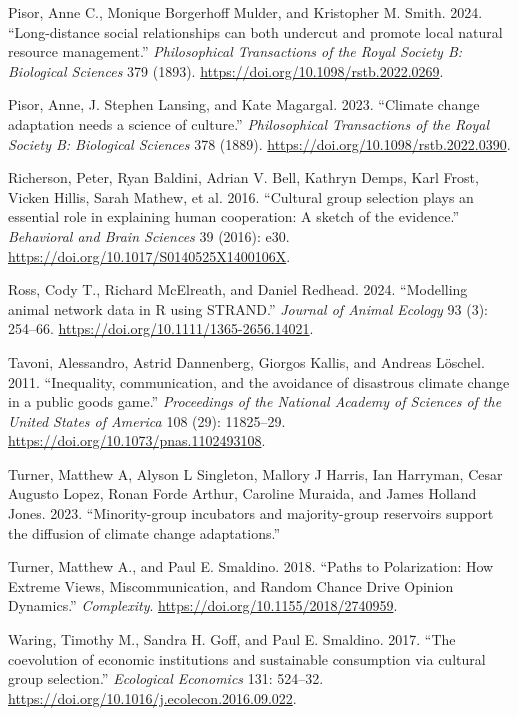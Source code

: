 \documentclass[letterpaper]{article}
\newlength{\cslhangindent}
\newenvironment{CSLReferences}[2] %
 {\begin{list}{}{%
  \setlength{\itemindent}{0pt}
  \setlength{\leftmargin}{0pt}
  \setlength{\parsep}{0pt}
  \ifodd #1
   \setlength{\leftmargin}{\cslhangindent}
   \setlength{\itemindent}{-1\cslhangindent}
  \fi
  \setlength{\itemsep}{#2\baselineskip}}}
 {\end{list}}
\begin{document}
\begin{CSLReferences}{1}{0}
Pisor, Anne C., Monique Borgerhoff Mulder, and Kristopher M. Smith.
2024. {``{Long-distance social relationships can both undercut and
promote local natural resource management}.''} \emph{Philosophical
Transactions of the Royal Society B: Biological Sciences} 379 (1893).
\url{https://doi.org/10.1098/rstb.2022.0269}.

Pisor, Anne, J. Stephen Lansing, and Kate Magargal. 2023. {``{Climate
change adaptation needs a science of culture}.''} \emph{Philosophical
Transactions of the Royal Society B: Biological Sciences} 378 (1889).
\url{https://doi.org/10.1098/rstb.2022.0390}.

Richerson, Peter, Ryan Baldini, Adrian V. Bell, Kathryn Demps, Karl
Frost, Vicken Hillis, Sarah Mathew, et al. 2016. {``{Cultural group
selection plays an essential role in explaining human cooperation: A
sketch of the evidence}.''} \emph{Behavioral and Brain Sciences} 39
(2016): e30. \url{https://doi.org/10.1017/S0140525X1400106X}.

Ross, Cody T., Richard McElreath, and Daniel Redhead. 2024.
{``{Modelling animal network data in R using STRAND}.''} \emph{Journal
of Animal Ecology} 93 (3): 254--66.
\url{https://doi.org/10.1111/1365-2656.14021}.

Tavoni, Alessandro, Astrid Dannenberg, Giorgos Kallis, and Andreas
Löschel. 2011. {``{Inequality, communication, and the avoidance of
disastrous climate change in a public goods game}.''} \emph{Proceedings
of the National Academy of Sciences of the United States of America} 108
(29): 11825--29. \url{https://doi.org/10.1073/pnas.1102493108}.

Turner, Matthew A, Alyson L Singleton, Mallory J Harris, Ian Harryman,
Cesar Augusto Lopez, Ronan Forde Arthur, Caroline Muraida, and James
Holland Jones. 2023. {``{Minority-group incubators and majority-group
reservoirs support the diffusion of climate change adaptations}.''}

Turner, Matthew A., and Paul E. Smaldino. 2018. {``{Paths to
Polarization: How Extreme Views, Miscommunication, and Random Chance
Drive Opinion Dynamics}.''} \emph{Complexity}.
\url{https://doi.org/10.1155/2018/2740959}.

Waring, Timothy M., Sandra H. Goff, and Paul E. Smaldino. 2017. {``{The
coevolution of economic institutions and sustainable consumption via
cultural group selection}.''} \emph{Ecological Economics} 131: 524--32.
\url{https://doi.org/10.1016/j.ecolecon.2016.09.022}.


\end{CSLReferences}
\end{document}
